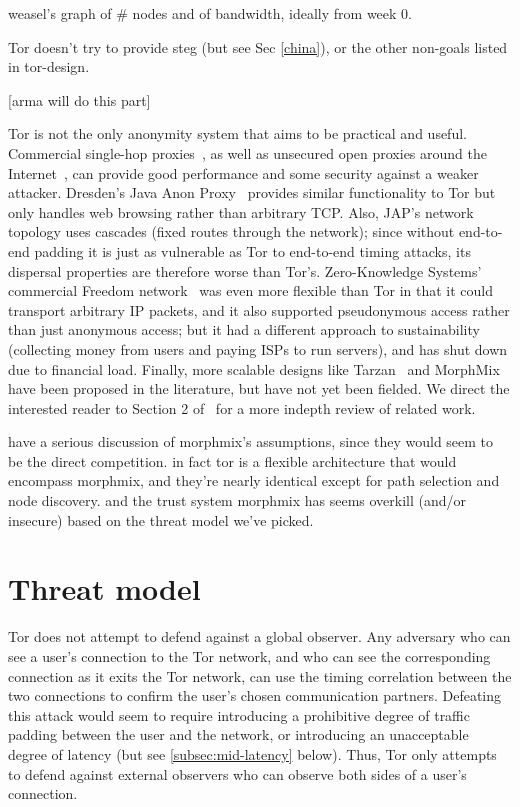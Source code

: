\documentclass{llncs}
\begin{document}
weasel's graph of \# nodes and of bandwidth, ideally from week 0.

Tor doesn't try to provide steg (but see Sec \ref{china}), or
the other non-goals listed in tor-design.

[arma will do this part]

Tor is not the only anonymity system that aims to be practical and useful.
Commercial single-hop proxies~\cite{anonymizer}, as well as unsecured
open proxies around the Internet~\cite{open-proxies}, can provide good
performance and some security against a weaker attacker. Dresden's Java
Anon Proxy~\cite{jap} provides similar functionality to Tor but only
handles web browsing rather than arbitrary TCP. Also, JAP's network
topology uses cascades (fixed routes through the network); since without
end-to-end padding it is just as vulnerable as Tor to end-to-end timing
attacks, its dispersal properties are therefore worse than Tor's.
Zero-Knowledge Systems' commercial Freedom
network~\cite{freedom21-security} was even more flexible than Tor in
that it could transport arbitrary IP packets, and it also supported
pseudonymous access rather than just anonymous access; but it had
a different approach to sustainability (collecting money from users
and paying ISPs to run servers), and has shut down due to financial
load.  Finally, more scalable designs like Tarzan~\cite{tarzan} and
MorphMix~\cite{morphmix} have been proposed in the literature, but
have not yet been fielded. We direct the interested reader to Section
2 of~\cite{tor-design} for a more indepth review of related work.



have a serious discussion of morphmix's assumptions, since they would
seem to be the direct competition. in fact tor is a flexible architecture
that would encompass morphmix, and they're nearly identical except for
path selection and node discovery. and the trust system morphmix has
seems overkill (and/or insecure) based on the threat model we've picked.

\section{Threat model}

Tor does not attempt to defend against a global observer.  Any adversary who
can see a user's connection to the Tor network, and who can see the
corresponding connection as it exits the Tor network, can use the timing
correlation between the two connections to confirm the user's chosen
communication partners.  Defeating this attack would seem to require
introducing a prohibitive degree of traffic padding between the user and the
network, or introducing an unacceptable degree of latency (but see
\ref{subsec:mid-latency} below).  Thus, Tor only
attempts to defend against external observers who can observe both sides of a
user's connection.
\end{document}
